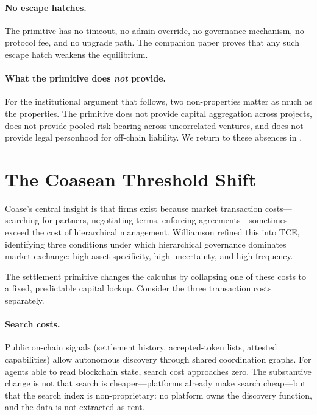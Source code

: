 \documentclass[11pt,a4paper]{article}
\theoremstyle{definition}
\theoremstyle{remark}
\begin{document}
\paragraph{No escape hatches.}
The primitive has no timeout, no admin override, no governance
mechanism, no protocol fee, and no upgrade path. The companion paper
proves that any such escape hatch weakens the equilibrium.

\paragraph{What the primitive does \emph{not} provide.}
For the institutional argument that follows, two non-properties matter
as much as the properties. The primitive does not provide capital
aggregation across projects, does not provide pooled risk-bearing
across uncorrelated ventures, and does not provide legal personhood
for off-chain liability. We return to these absences in
.

\section{The Coasean Threshold Shift}
\label{sec:threshold}

Coase's central insight is that firms exist because market
transaction costs---searching for partners, negotiating terms,
enforcing agreements---sometimes exceed the cost of hierarchical
management. Williamson refined this into TCE, identifying three
conditions under which hierarchical governance dominates market
exchange: high asset specificity, high uncertainty, and high
frequency.

The settlement primitive changes the calculus by collapsing one of
these costs to a fixed, predictable capital lockup. Consider the
three transaction costs separately.

\paragraph{Search costs.}
Public on-chain signals (settlement history, accepted-token lists,
attested capabilities) allow autonomous discovery through shared
coordination graphs. For agents able to read blockchain state,
search cost approaches zero. The substantive change is not that
search is cheaper---platforms already make search cheap---but that
the search index is non-proprietary: no platform owns the discovery
function, and the data is not extracted as rent.
\end{document}
